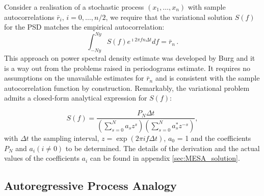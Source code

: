 \documentclass[twocolumn,showpacs,preprintnumbers,nofootinbib,prd,
superscriptaddress,10pt]{revtex4-1}
\begin{document}
Consider a realisation of a stochastic process $(x_1,\ldots,x_n)$ with sample autocorrelations $\bar r_i,\,i=0,\ldots, n/2$, we require that the variational solution $S(f)$ for the PSD matches the empirical autocorrelation:
\begin{equation}\label{eq:MaxConstraint}
\int_{-Ny}^{Ny} S(f) e^{\imath 2 \pi f n \Delta t} df = \bar r_{n}\,.
\end{equation}
This approach on power spectral density estimate was developed by Burg \cite{burg1975maximum} and it is a way out from the problems raised in periodograms estimate. It requires no assumptions on the unavailable estimates for $\bar r_n$ and is consistent with the sample autocorrelation function by construction. Remarkably, the variational problem admits a closed-form analytical expression for $S(f)$:

\begin{equation}\label{eq:MESApsd}
    S(f) = \frac{P_N \Delta t}{\left(\sum_{s=0}^N a_s z^s\right)\left(\sum_{s = 0}^N a^*_s z^{-s}\right)}, 
\end{equation}
with $\Delta t$ the sampling interval, $z=\exp{(2\pi i f\Delta t)}$, $a_0$ = 1 and the coefficients $P_N$ and $a_i (i \neq 0)$ to be determined. The details of the derivation and the actual values of the coefficients $a_i$ can be found in appendix \ref{sec:MESA_solution}.

\subsection{Autoregressive Process Analogy} \label{sec:autoregr}
\end{document}
